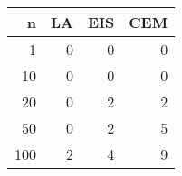 
\begin{tabular}{rrrr}
\toprule
n & LA & EIS & CEM\\
\midrule
1 & 0 & 0 & 0\\
10 & 0 & 0 & 0\\
20 & 0 & 2 & 2\\
50 & 0 & 2 & 5\\
100 & 2 & 4 & 9\\
\bottomrule
\end{tabular}